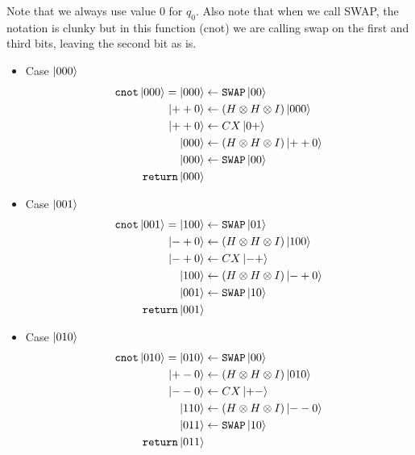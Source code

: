 \documentclass[11pt]{article}
\def\swap{\texttt{SWAP}}
\def\cnot{\texttt{cnot}}
\begin{document}
Note that we always use value 0 for $q_0$.
Also note that when we call SWAP, the notation is clunky but in this function (cnot) we are calling swap on the first and third bits, leaving the second bit as is.
\begin{itemize}
\item[] Case $\ket{000}$ 
\begin{align*}
    \cnot\ket{000} = 
    \ket{000} &\leftarrow \swap\ket{00} \\
    \ket{++0} &\leftarrow (H \otimes H \otimes I)\ket{000} \\
    \ket{++0} &\leftarrow CX\ket{0+} \\
    \ket{000} &\leftarrow (H \otimes H \otimes I)\ket{++0} \\
    \ket{000} &\leftarrow \swap\ket{00} \\
     \texttt{return} \ket{000}
\end{align*}


\item[] Case $\ket{001}$ 
\begin{align*}
    \cnot\ket{001} = %
    \ket{100} &\leftarrow \swap\ket{01} \\
    \ket{-+0} &\leftarrow (H \otimes H \otimes I)\ket{100} \\
    \ket{-+0} &\leftarrow CX\ket{-+} \\
    \ket{100} &\leftarrow (H \otimes H \otimes I)\ket{-+0} \\
    \ket{001} &\leftarrow \swap\ket{10} \\
     \texttt{return} \ket{001}
\end{align*}


\item[] Case $\ket{010}$ 
\begin{align*}
    \cnot\ket{010} = %
    \ket{010} &\leftarrow \swap\ket{00} \\
    \ket{+-0} &\leftarrow (H \otimes H \otimes I)\ket{010} \\
    \ket{--0} &\leftarrow CX\ket{+-} \\
    \ket{110} &\leftarrow (H \otimes H \otimes I)\ket{--0} \\
    \ket{011} &\leftarrow \swap\ket{10} \\
     \texttt{return} \ket{011}
\end{align*}



\end{itemize}
\end{document}
